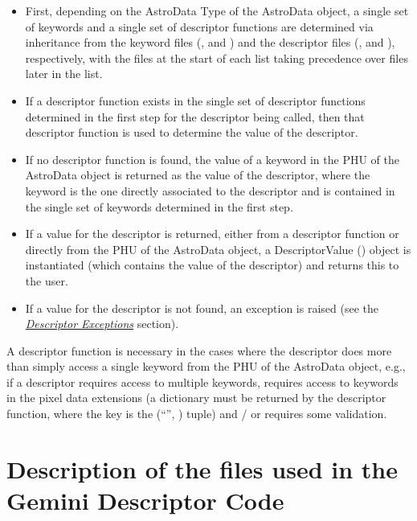 \documentclass[letterpaper,10pt,english]{sphinxmanual}
\begin{document}
\begin{itemize}
\item {} 
First, depending on the AstroData Type of the AstroData object, a single
set of keywords and a single set of descriptor functions are determined via
inheritance from the keyword files (,
 and ) and the descriptor files
(,  and
), respectively, with the files at the start of
each list taking precedence over files later in the list.

\item {} 
If a descriptor function exists in the single set of descriptor functions
determined in the first step for the descriptor being called, then that
descriptor function is used to determine the value of the descriptor.

\item {} 
If no descriptor function is found, the value of a keyword in the PHU of
the AstroData object is returned as the value of the descriptor, where the
keyword is the one directly associated to the descriptor and is contained
in the single set of keywords determined in the first step.

\item {} 
If a value for the descriptor is returned, either from a descriptor
function or directly from the PHU of the AstroData object, a
DescriptorValue () object is instantiated (which contains the value
of the descriptor) and returns this to the user.

\item {} 
If a value for the descriptor is not found, an exception is raised (see the
{\hyperref[coding:descriptor-exceptions]{\emph{Descriptor Exceptions}}} section).

\end{itemize}

A descriptor function is necessary in the cases where the descriptor does more
than simply access a single keyword from the PHU of the AstroData object, e.g.,
if a descriptor requires access to multiple keywords, requires access to
keywords in the pixel data extensions (a dictionary must be returned by the
descriptor function, where the key is the (``'', ) tuple)
and / or requires some validation.


\section{Description of the files used in the Gemini Descriptor Code}
\label{coding:description-of-the-files-used-in-the-gemini-descriptor-code}
\end{document}
